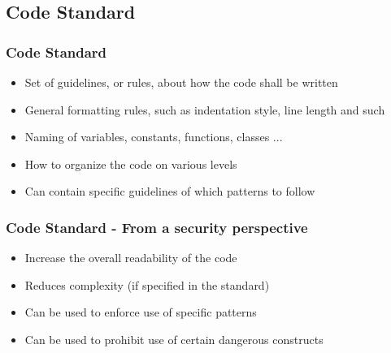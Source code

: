 \documentclass{beamer}
\begin{document}
\subsection{Code Standard}
\begin{frame}
\frametitle{Code Standard}
\begin{itemize}
  \item Set of guidelines, or rules, about how the code shall be written
  \item General formatting rules, such as indentation style, line length and such
  \item Naming of variables, constants, functions, classes ...
  \item How to organize the code on various levels
  \item Can contain specific guidelines of which patterns to follow
\end{itemize}
\end{frame}
\begin{frame}
\frametitle{Code Standard - From a security perspective}
\begin{itemize}
  \item Increase the overall readability of the code
  \item Reduces complexity (if specified in the standard)
  \item Can be used to enforce use of specific patterns
  \item Can be used to prohibit use of certain dangerous constructs
\end{itemize}
\end{frame}
\end{document}
